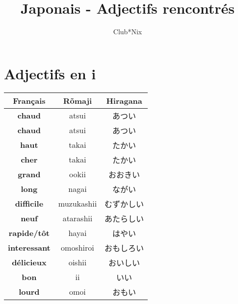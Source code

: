 \documentclass[11pt]{report}
\title{Japonais - Adjectifs rencontrés}
\author{
	Club*Nix
}
\newenvironment{Japanese}{%
\CJKfamily{min}%
\CJKtilde  
\CJKnospace}{}
\begin{document}
\maketitle
\tableofcontents

\chapter{Adjectifs en i}

\begin{CJK}{UTF8}{}  
\begin{Japanese}
	\begin{center}
		\begin{multicols}{2}
			\begin{tabular}{|c|c|c|}
				\hline
				\textbf{Français} & \textbf{Rõmaji} & \textbf{Hiragana} \\
				\hline
				\textbf{chaud} & atsui & あつい \\%
				\hline
				\textbf{chaud} & atsui & あつい \\%
				\hline
				\textbf{haut} & takai & たかい \\%
				\hline
				\textbf{cher} & takai & たかい \\%
				\hline
				\textbf{grand} & ookii & おおきい \\%
				\hline
				\textbf{long} & nagai & ながい \\%
				\hline
				\textbf{difficile} & muzukashii & むずかしい \\%
				\hline
				\textbf{neuf} & atarashii & あたらしい \\%
				\hline
				\textbf{rapide/t\^ot} & hayai & はやい \\%
				\hline
				\textbf{interessant} & omoshiroi & おもしろい \\%
				\hline
				\textbf{délicieux} & oishii & おいしい \\%
				\hline
				\textbf{bon} & ii & いい \\%
				\hline
				\textbf{lourd} & omoi & おもい \\%
				\hline


\end{tabular}
\end{multicols}
\end{center}
\end{Japanese}
\end{CJK}
\end{document}
